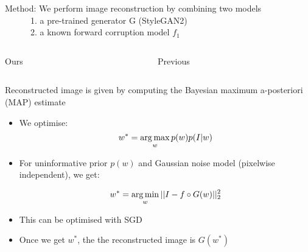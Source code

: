 \begin{frame}{Method: We perform image reconstruction by combining two models\\
\ \ \ \ \ \  1. a pre-trained generator G (StyleGAN2)\\
\ \ \ \ \ \  2. a known forward corruption model $f_1$
}



\begin{columns}[t]
 \begin{column}{0.6\textwidth}
\centering
 
\begin{overprint}
  
  
\end{overprint} 
  Ours
 \end{column}

 \begin{column}{0.3\textwidth}
  \centering

  
  Previous

 
 \end{column}
\end{columns} 
 


 
\end{frame}

\newcommand{\ci}[1]{\circ{#1}}
\newcommand{\wplus}{$\mathcal{W}^{+}$ }
\newcommand{\loss}{\mathcal{L}}

\begin{frame}{Reconstructed image is given by computing the Bayesian maximum a-posteriori (MAP) estimate\\
}



\begin{itemize}
 \item We optimise:
$$ w^* = \operatorname*{arg\,max}_w p(w)p(I|w)$$

\item For uninformative prior $p(w)$ and Gaussian noise model (pixelwise independent), we get:

$$ w^* = \operatorname*{arg\,min}_w || I - f \circ G (w) ||_2^2$$

\item This can be optimised with SGD

\item Once we get $w^*$, the the reconstructed image is $G(w^*)$

\end{itemize}

\begin{center}
\vt
{}
\end{center}
 
\end{frame}

